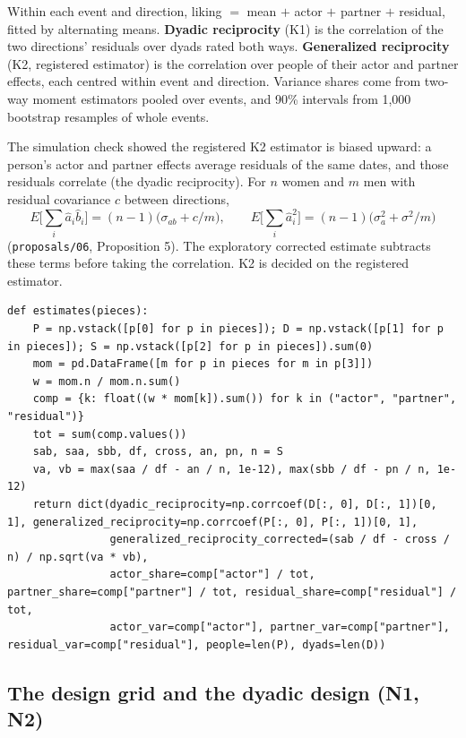\documentclass[11pt]{article}
\begin{document}
Within each event and direction, liking $=$ mean $+$ actor $+$ partner $+$ residual, fitted by alternating means.
\textbf{Dyadic reciprocity} (K1) is the correlation of the two directions' residuals over dyads rated both ways.
\textbf{Generalized reciprocity} (K2, registered estimator) is the correlation over people of their actor and partner
effects, each centred within event and direction. Variance shares come from two-way moment estimators pooled over
events, and 90\% intervals from 1,000 bootstrap resamples of whole events.

The simulation check showed the registered K2 estimator is biased upward: a person's actor and partner effects average
residuals of the same dates, and those residuals correlate (the dyadic reciprocity). For $n$ women and $m$ men with
residual covariance $c$ between directions,
\[
E\Big[\sum_i \hat a_i \hat b_i\Big] = (n-1)\big(\sigma_{ab} + c/m\big), \qquad E\Big[\sum_i \hat a_i^2\Big] = (n-1)\big(\sigma_a^2 + \sigma^2/m\big)
\]
(\texttt{proposals/06}, Proposition 5). The exploratory corrected estimate subtracts these terms before taking the
correlation. K2 is decided on the registered estimator.

\begin{lstlisting}[caption={Reciprocity estimates and the correction (scripts/srm.py)}]
def estimates(pieces):
    P = np.vstack([p[0] for p in pieces]); D = np.vstack([p[1] for p in pieces]); S = np.vstack([p[2] for p in pieces]).sum(0)
    mom = pd.DataFrame([m for p in pieces for m in p[3]])
    w = mom.n / mom.n.sum()
    comp = {k: float((w * mom[k]).sum()) for k in ("actor", "partner", "residual")}
    tot = sum(comp.values())
    sab, saa, sbb, df, cross, an, pn, n = S
    va, vb = max(saa / df - an / n, 1e-12), max(sbb / df - pn / n, 1e-12)
    return dict(dyadic_reciprocity=np.corrcoef(D[:, 0], D[:, 1])[0, 1], generalized_reciprocity=np.corrcoef(P[:, 0], P[:, 1])[0, 1],
                generalized_reciprocity_corrected=(sab / df - cross / n) / np.sqrt(va * vb),
                actor_share=comp["actor"] / tot, partner_share=comp["partner"] / tot, residual_share=comp["residual"] / tot,
                actor_var=comp["actor"], partner_var=comp["partner"], residual_var=comp["residual"], people=len(P), dyads=len(D))
\end{lstlisting}

\subsection{The design grid and the dyadic design (N1, N2)}
\end{document}
